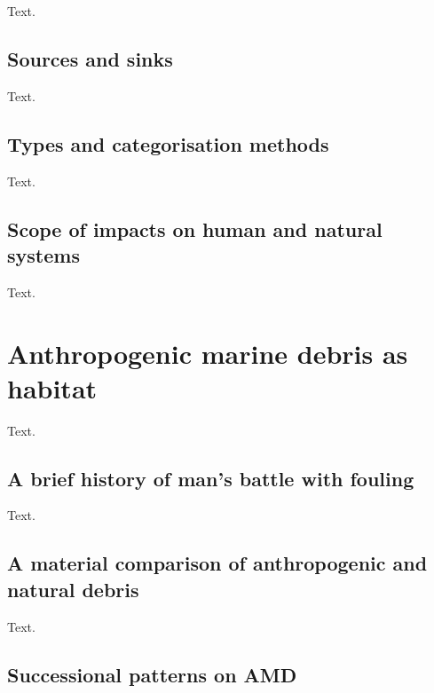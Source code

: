 \documentclass[a4paper, nobind]{templates/ociamthesis}
\begin{document}
Text.

\hypertarget{sources-and-sinks}{%
\subsection{Sources and sinks}\label{sources-and-sinks}}

Text.

\hypertarget{types-and-categorisation-methods}{%
\subsection{Types and categorisation methods}\label{types-and-categorisation-methods}}

Text.

\hypertarget{scope-of-impacts-on-human-and-natural-systems}{%
\subsection{Scope of impacts on human and natural systems}\label{scope-of-impacts-on-human-and-natural-systems}}

Text.

\hypertarget{anthropogenic-marine-debris-as-habitat}{%
\section{Anthropogenic marine debris as habitat}\label{anthropogenic-marine-debris-as-habitat}}

Text.

\hypertarget{a-brief-history-of-mans-battle-with-fouling}{%
\subsection{A brief history of man's battle with fouling}\label{a-brief-history-of-mans-battle-with-fouling}}

Text.

\hypertarget{a-material-comparison-of-anthropogenic-and-natural-debris}{%
\subsection{A material comparison of anthropogenic and natural debris}\label{a-material-comparison-of-anthropogenic-and-natural-debris}}

Text.

\hypertarget{successional-patterns-on-amd}{%
\subsection{Successional patterns on AMD}\label{successional-patterns-on-amd}}
\end{document}
